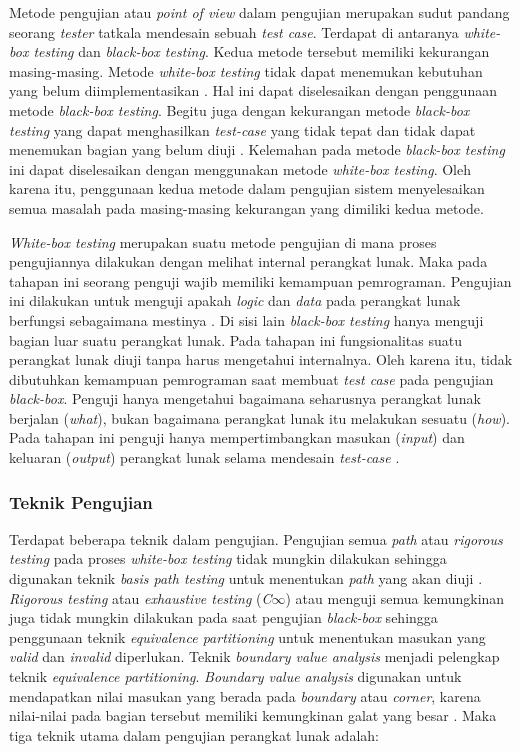 Metode pengujian atau \emph{point of view} dalam pengujian merupakan
sudut pandang seorang \emph{tester} tatkala mendesain sebuah
\emph{test case}. Terdapat di antaranya \emph{white-box testing} dan
\emph{black-box testing}. Kedua metode tersebut memiliki kekurangan
masing-masing. Metode \emph{white-box testing} tidak dapat menemukan
kebutuhan yang belum diimplementasikan
\parencite{dijkstra1970notes}. Hal ini dapat diselesaikan dengan
penggunaan metode \emph{black-box testing}. Begitu juga dengan
kekurangan metode \emph{black-box testing} yang dapat menghasilkan
\emph{test-case} yang tidak tepat dan tidak dapat menemukan bagian
yang belum diuji \parencite{savenkov2008become}. Kelemahan pada metode
\emph{black-box testing} ini dapat diselesaikan dengan menggunakan
metode \emph{white-box testing}. Oleh karena itu, penggunaan kedua metode
dalam pengujian sistem menyelesaikan semua masalah pada masing-masing kekurangan
yang dimiliki kedua metode.

\emph{White-box testing} merupakan suatu metode pengujian di mana
proses pengujiannya dilakukan dengan melihat internal perangkat lunak.
Maka pada tahapan ini seorang penguji wajib memiliki kemampuan
pemrograman. Pengujian ini dilakukan untuk menguji apakah \emph{logic}
dan \emph{data} pada perangkat lunak berfungsi sebagaimana mestinya
\parencite{myers2011art}. Di sisi lain \emph{black-box testing} hanya
menguji bagian luar suatu perangkat lunak. Pada tahapan ini
fungsionalitas suatu perangkat lunak diuji tanpa harus mengetahui
internalnya. Oleh karena itu, tidak dibutuhkan kemampuan pemrograman
saat membuat \emph{test case} pada pengujian \emph{black-box}. Penguji
hanya mengetahui bagaimana seharusnya perangkat lunak berjalan
(\emph{what}), bukan bagaimana perangkat lunak itu melakukan sesuatu
(\emph{how}). Pada tahapan ini penguji hanya mempertimbangkan masukan
(\emph{input}) dan keluaran (\emph{output}) perangkat lunak selama
mendesain \emph{test-case} \parencite{myers2011art}.


\subsubsection{Teknik Pengujian}

Terdapat beberapa teknik dalam pengujian. Pengujian semua \emph{path}
atau \emph{rigorous testing} pada proses \emph{white-box testing}
tidak mungkin dilakukan sehingga digunakan teknik \emph{basis path
testing} untuk menentukan \emph{path} yang akan diuji
\parencite{gregory2007path}. \emph{Rigorous testing} atau
\emph{exhaustive testing} (\emph{C$\infty$}) atau menguji semua
kemungkinan juga tidak mungkin dilakukan pada saat pengujian
\emph{black-box} sehingga penggunaan teknik \emph{equivalence
partitioning} untuk menentukan masukan yang \emph{valid} dan
\emph{invalid} diperlukan. Teknik \emph{boundary value analysis}
menjadi pelengkap teknik \emph{equivalence
partitioning}. \emph{Boundary value analysis} digunakan untuk
mendapatkan nilai masukan yang berada pada \emph{boundary} atau
\emph{corner}, karena nilai-nilai pada bagian tersebut memiliki
kemungkinan galat yang besar \parencite{presman2010software}. Maka tiga teknik
utama dalam pengujian perangkat lunak adalah:

